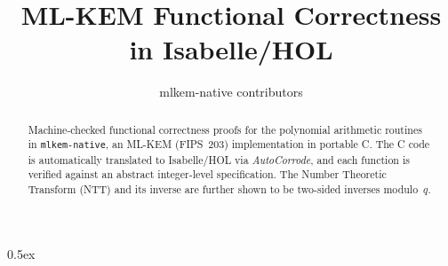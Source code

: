 \documentclass[10pt,a4paper]{article}
\begin{document}
\title{ML-KEM Functional Correctness in Isabelle/HOL}
\author{mlkem-native contributors}
\maketitle

\begin{abstract}
Machine-checked functional correctness proofs for the polynomial
arithmetic routines in \texttt{mlkem-native}, an ML-KEM (FIPS~203)
implementation in portable C\@.  The C code is automatically translated
to Isabelle/HOL via \emph{AutoCorrode}, and each function is verified
against an abstract integer-level specification.  The Number Theoretic
Transform (NTT) and its inverse are further shown to be two-sided
inverses modulo~$q$.
\end{abstract}

\tableofcontents

\parindent 0pt\parskip 0.5ex


\end{document}
